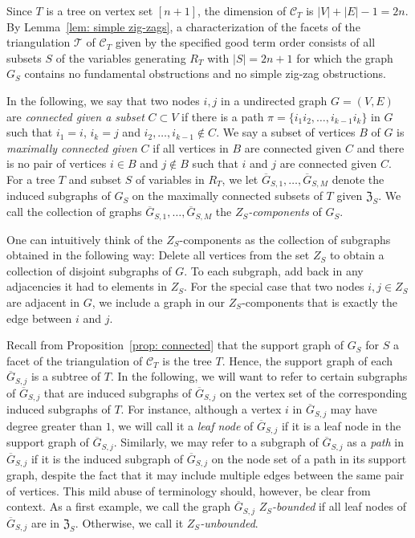 Since $T$ is a tree on vertex set $[n+1]$, the dimension of $\mathcal{C}_T$ is $|V| + |E| -1 = 2n$.  
By Lemma~\ref{lem: simple zig-zags}, a characterization of the facets of the triangulation $\mathcal{T}$ of $\mathcal{C}_T$ given by the specified good term order consists of  all subsets $S$ of the variables generating $R_T$ with $|S| = 2n+1$ for which the graph $G_S$ contains no fundamental obstructions and no simple zig-zag obstructions. 

In the following, we say that two nodes $i,j$ in a undirected graph $G = (V,E)$ are \emph{connected given a subset} $C\subset V$ if there is a path $\pi = \{i_1i_2,\ldots, i_{k-1}i_k\}$ in $G$ such that $i_1 = i$, $i_k = j$ and $i_2,\ldots, i_{k-1}\notin C$.  
We say a subset of vertices $B$ of $G$ is \emph{maximally connected given} $C$ if all vertices in $B$ are connected given $C$ and there is no pair of vertices $i\in B$ and $j\notin B$ such that $i$ and $j$ are connected given $C$. 
For a tree $T$ and subset $S$ of variables in $R_T$, we let $\overline{G}_{S,1},\ldots, \overline{G}_{S,M}$ denote the induced subgraphs of $G_S$ on the maximally connected subsets of $T$ given $\mathfrak{Z}_S$. 
We call the collection of graphs $\overline{G}_{S,1},\ldots, \overline{G}_{S,M}$ the \emph{$Z_S$-components} of $G_S$.
\begin{rema}
    \label{rmk:ZScomp_intuition}
    One can intuitively think of the $Z_S$-components as the collection of subgraphs obtained in the following way: Delete all vertices from the set $Z_S$ to obtain a collection of disjoint subgraphs of $G$. To each subgraph, add back in any adjacencies it had to elements in $Z_S$. For the special case that two nodes $i,j\in Z_S$ are adjacent in $G$, we include a graph in our $Z_S$-components that is exactly the edge between $i$ and $j$. 
\end{rema}

Recall from Proposition~\ref{prop: connected} that the support graph of $G_S$ for $S$ a facet of the triangulation of $\mathcal{C}_T$ is the tree $T$. 
Hence, the support graph of each $\overline{G}_{S,j}$ is a subtree of $T$. 
In the following, we will want to refer to certain subgraphs of $\overline{G}_{S,j}$ that are induced subgraphs of $\overline{G}_{S,j}$ on the vertex set of the corresponding induced subgraphs of $T$.  
For instance, although a vertex $i$ in $\overline{G}_{S,j}$ may have degree greater than $1$, we will call it a \emph{leaf node} of $\overline{G}_{S,j}$ if it is a leaf node in the support graph of $\overline{G}_{S,j}$.  
Similarly, we may refer to a subgraph of $\overline{G}_{S,j}$ as a \emph{path} in $\overline{G}_{S,j}$ if it is the induced subgraph of $\overline{G}_{S,j}$ on the node set of a path in its support graph, despite the fact that it may include multiple edges between the same pair of vertices.
This mild abuse of terminology should, however, be clear from context.
As a first example, we call the graph $\overline{G}_{S,j}$ \emph{$Z_S$-bounded} if all leaf nodes of $\overline{G}_{S,j}$ are in $\mathfrak{Z}_S$.  
Otherwise, we call it \emph{$Z_S$-unbounded}.

